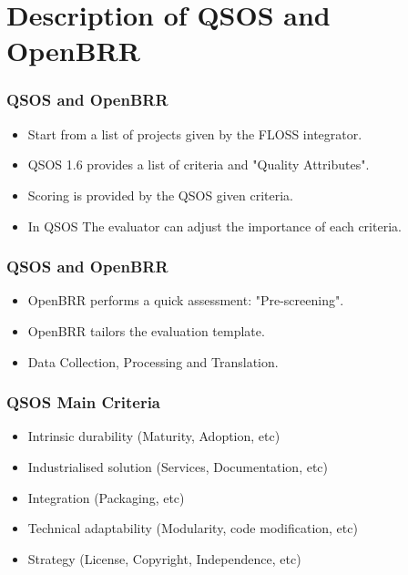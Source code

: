 \documentclass{beamer}
\begin{document}

\section{Description of QSOS and OpenBRR}



\begin{frame}
\frametitle{QSOS and OpenBRR}
 \begin{itemize}
 \item Start from a list of projects given by the FLOSS integrator.
 \item QSOS 1.6 provides a list of criteria and "Quality Attributes".
 \item Scoring is provided by the QSOS given criteria.
 \item In QSOS The evaluator can adjust the importance of each criteria.
 \end{itemize}
\end{frame}


\begin{frame}
\frametitle{QSOS and OpenBRR}
 \begin{itemize}
 \item OpenBRR performs a quick assessment: "Pre-screening".
 \item OpenBRR tailors the evaluation template.
 \item Data Collection, Processing and Translation.
 \end{itemize}
\end{frame}


\begin{frame}
 \frametitle{QSOS Main Criteria}
 \begin{itemize}
     \item Intrinsic durability (Maturity, Adoption, etc)
     \item Industrialised solution (Services, Documentation, etc)
     \item Integration (Packaging, etc)
     \item Technical adaptability (Modularity, code modification, etc)
     \item Strategy (License, Copyright, Independence, etc)
 \end{itemize}
\end{frame}
\end{document}
